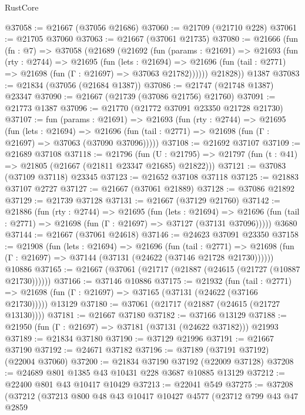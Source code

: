 \begin{lexlean}{RustCore}
\begin{coremodule}
@37058 := @21667 (@37056 @21686)
@37060 := @21709 (@21710 @228)
@37061 := @21705 @37060
@37063 := @21667 (@37061 @21735)
@37080 := @21666
    (fun (fn : @7) =>
    @37058
      (@21689
        (@21692
          (fun (params : @21691) =>
          @21693
            (fun (rty : @2744) =>
            @21695
              (fun (lets : @21694) =>
              @21696 (fun (tail : @2771) => @21698 (fun (Γ : @21697) => @37063 @21782))))))
        @21828))
    @1387
@37083 := @21834 (@37056 (@21684 @1387))
@37086 := @21747 (@21748 @1387) @23347
@37090 := @21667 (@21739 (@37086 @21756) @21760)
@37091 := @21773 @1387
@37096 := @21770 (@21772 @37091 @23350 @21728 @21730)
@37107 := fun (params : @21691) =>
  @21693
    (fun (rty : @2744) =>
    @21695
      (fun (lets : @21694) =>
      @21696 (fun (tail : @2771) => @21698 (fun (Γ : @21697) => @37063 (@37090 @37096)))))
@37108 := @21692 @37107
@37109 := @21689 @37108
@37118 := @21796
    (fun (U : @21795) => @21797 (fun (t : @41) => @21805 (@21667 (@21811 @23347 @21685) @21822)))
@37121 := @37083 (@37109 @37118) @23345
@37123 := @21652 @37108 @37118
@37125 := @21883 @37107 @2727
@37127 := @21667 (@37061 @21889)
@37128 := @37086 @21892
@37129 := @21739 @37128
@37131 := @21667 (@37129 @21760)
@37142 := @21886
    (fun (rty : @2744) =>
    @21695
      (fun (lets : @21694) =>
      @21696 (fun (tail : @2771) => @21698 (fun (Γ : @21697) => @37127 (@37131 @37096)))))
    @3680
@37144 := @21667 (@37061 @24618)
@37146 := @24623 @37091 @23350
@37158 := @21908
    (fun (lets : @21694) =>
    @21696
      (fun (tail : @2771) =>
      @21698 (fun (Γ : @21697) => @37144 (@37131 (@24622 (@37146 @21728 @21730))))))
    @10886
@37165 := @21667 (@37061 (@21717 (@21887 (@24615 (@21727 (@10887 @21730))))))
@37166 := @37146 @10886
@37175 := @21932
    (fun (tail : @2771) => @21698 (fun (Γ : @21697) => @37165 (@37131 (@24622 (@37166 @21730)))))
    @13129
@37180 := @37061 (@21717 (@21887 (@24615 (@21727 @13130))))
@37181 := @21667 @37180
@37182 := @37166 @13129
@37188 := @21950 (fun (Γ : @21697) => @37181 (@37131 (@24622 @37182))) @21993
@37189 := @21834 @37180
@37190 := @37129 @21996
@37191 := @21667 @37190
@37192 := @24671 @37182
@37196 := @37189 (@37191 @37192) (@22004 @37060)
@37200 := @21834 @37190 @37192 (@22009 @37128)
@37208 := @24689 @801 @1385 @43 @10431 @228 @3687 @10885 @13129
@37212 := @22400 @801 @43 @10417 @10429
@37213 := @22041 @549
@37275 := @37208
    (@37212
      (@37213
        @800
        @48
        @43
        @10417
        @10427
        @4577
        (@23712
          @799
          @43
          @47
          @2859

\end{coremodule}
\end{lexlean}
